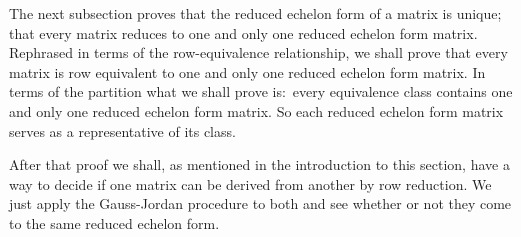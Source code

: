 The next subsection proves that the reduced echelon form of a matrix is 
unique; that 
every matrix reduces to one and only one reduced echelon form matrix.
Rephrased in terms of the row-equivalence relationship, 
we shall prove that every matrix is 
row equivalent to one and only one reduced echelon form matrix.
In terms of the partition what we shall prove is:~every
equivalence class contains one and only one reduced echelon form matrix.
So each reduced echelon form matrix serves as a representative of its 
class.

After that proof we shall, 
as mentioned in the introduction to this section, have a
way to decide if one matrix can be derived from another by row reduction.
We just apply the Gauss-Jordan procedure to both and see whether
or not they come to the same reduced echelon form.

